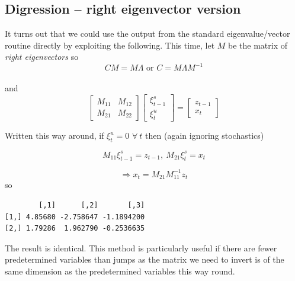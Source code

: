 \documentclass[
  letterpaper,
]{book}
\newenvironment{Shaded}{\begin{snugshade}}{\end{snugshade}}
\newcommand{\CommentTok}[1]{\textcolor[rgb]{0.37,0.37,0.37}{#1}}
\newcommand{\DecValTok}[1]{\textcolor[rgb]{0.68,0.00,0.00}{#1}}
\newcommand{\FunctionTok}[1]{\textcolor[rgb]{0.28,0.35,0.67}{#1}}
\newcommand{\NormalTok}[1]{\textcolor[rgb]{0.00,0.23,0.31}{#1}}
\newcommand{\OtherTok}[1]{\textcolor[rgb]{0.00,0.23,0.31}{#1}}
\newcommand{\SpecialCharTok}[1]{\textcolor[rgb]{0.37,0.37,0.37}{#1}}
\begin{document}
\hypertarget{digression-right-eigenvector-version}{%
\subsection{Digression -- right eigenvector
version}\label{digression-right-eigenvector-version}}

It turns out that we could use the output from the standard
eigenvalue/vector routine directly by exploiting the following. This
time, let \(M\) be the matrix of \emph{right eigenvectors} so \[
  C M = M \Lambda \text{  or  } C = M\Lambda M^{-1}
\]\\
and \[
\begin{bmatrix} M_{11} & M_{12} \\ M_{21} & M_{22} \end{bmatrix}
\begin{bmatrix} \xi_{t-1}^s \\ \xi_t^u \end{bmatrix}
 = 
\begin{bmatrix} z_{t-1} \\ x_t \end{bmatrix}
\]

Written this way around, if \(\xi_t^{u}=0\) \(\forall\ t\) then (again
ignoring stochastics)

\[
  M_{11} \xi_{t-1}^s = z_{t-1}, \ M_{21}\xi_t^s = x_t 
\]

\[
   \Rightarrow x_t = M_{21} M_{11}^{-1} z_t
\] so

\begin{Shaded}
\end{Shaded}

\begin{verbatim}
        [,1]      [,2]       [,3]
[1,] 4.85680 -2.758647 -1.1894200
[2,] 1.79286  1.962790 -0.2536635
\end{verbatim}

The result is identical. This method is particularly useful if there are
fewer predetermined variables than jumps as the matrix we need to invert
is of the same dimension as the predetermined variables this way round.
\end{document}
